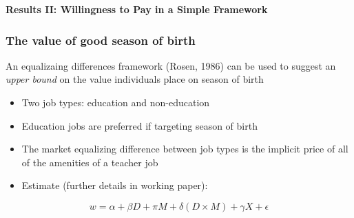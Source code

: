 \documentclass[10pt,letterpaper,subeqn]{beamer}
\begin{document}
\begin{frame}
  \begin{center}
    \textbf{Results II: Willingness to Pay in a Simple Framework}
  \end{center}
\end{frame}

\begin{frame}[label=equalizingDiff]
\frametitle{The value of good season of birth}
An equalizaing differences framework (Rosen, 1986) can be used to suggest an \emph{upper bound}
on the value individuals place on season of birth
\begin{itemize}
\item Two job types: education and non-education
\item Education jobs are preferred if targeting season of birth
\item The market equalizing difference between job types is the implicit price of all of the amenities
  of a teacher job
\item Estimate (further details in working paper):
\end{itemize}
\[
w = \alpha + \beta D + \pi M + \delta (D \times M) + \gamma X +  \epsilon
\]
\end{frame}
\end{document}
